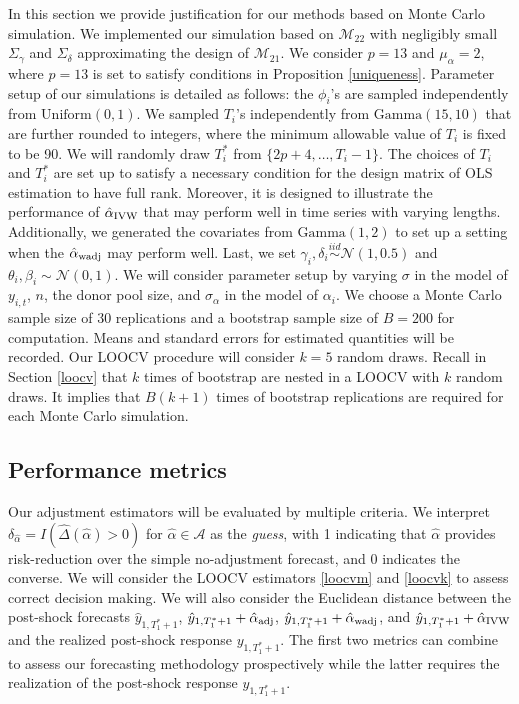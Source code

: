 \documentclass[11pt]{article}
\newcommand{\simiid}{\stackrel{iid}{\sim}} %
\def\mrm#1{\mathrm{#1}} %
\def\normal#1#2{\mathcal{N}(#1,#2)} %
\def\mc#1{\mathcal{#1}} %
\theoremstyle{definition}
\begin{document}
In this section we provide justification for our methods based on Monte Carlo simulation. We implemented our simulation based on $\mc{M}_{22}$ with negligibly small $\Sigma_{\gamma}$ and $\Sigma_{\delta}$ approximating the design of $\mathcal{M}_{21}$.  We consider $p=13$ and $\mu_{\alpha}=2$, where $p = 13$ is set to satisfy conditions in Proposition \ref{uniqueness}. Parameter setup of our simulations is detailed as follows: the $\phi_i$'s are sampled independently from $\mrm{Uniform}(0,1)$. We sampled $T_i$'s independently from  $\text{Gamma}(15, 10)$ that are further rounded to integers, where the minimum allowable value of $T_i$ is fixed to be 90. We will randomly draw $T_i^*$ from $\{2p + 4, \ldots, T_i-1\}$. The choices of $T_i$ and $T_i^*$ are set up to satisfy a necessary condition for the design matrix of OLS estimation to have full rank. Moreover, it is  designed to illustrate the performance of $\hat{\alpha}_{\rm IVW}$ that may perform well in time series with varying lengths. Additionally, we generated the covariates from $\text{Gamma}(1,2)$ to set up a setting when the $\hat{\alpha}_{\rm wadj}$ may perform well. Last, we set $\gamma_i, \delta_i\simiid  \normal{1}{0.5}$ and $\theta_i, \beta_i \sim \normal{0}{1}$. We will consider parameter setup by varying $\sigma$ in the model of $y_{i,t}$, $n$, the donor pool size, and $\sigma_{\alpha}$ in the model of $\alpha_i$. We choose a Monte Carlo sample size of $30$ replications and a bootstrap sample size of $B = 200$ for computation. Means and standard errors for estimated quantities will be recorded. Our LOOCV procedure will consider $k=5$ random draws. Recall in Section \ref{loocv} that $k$ times of bootstrap are nested in a LOOCV with $k$ random draws. It implies that $B(k+1)$ times of bootstrap replications are required for each Monte Carlo simulation.


\subsection{Performance metrics}

Our adjustment estimators will be evaluated by multiple criteria. We interpret $\delta_{\hat{\alpha}}= I(\hat{\Delta}(\hat{\alpha})>0)$ for $\hat{\alpha}\in \mc{A}$ as the \emph{guess}, with 1 indicating that $\hat{\alpha}$ provides risk-reduction over the simple no-adjustment forecast, and 0 indicates the converse. We will consider the LOOCV estimators \eqref{loocvm} and \eqref{loocvk} to assess correct decision making. We will also consider the Euclidean distance between the post-shock forecasts $\hat{y}_{1,T_1^*+1}$, $\hat{y}_{1,T_1^*+1}+ \hat{\alpha}_{\rm adj}$, $\hat{y}_{1,T_1^*+1}+\hat{\alpha}_{\rm wadj}$, and $\hat{y}_{1,T_1^*+1}+\hat{\alpha}_{\rm IVW}$ and the realized post-shock response $y_{1,T_1^*+1}$. The first two metrics can combine to assess our forecasting methodology prospectively while the latter requires the realization of the post-shock response $y_{1,T_1^*+1}$. 
\end{document}
